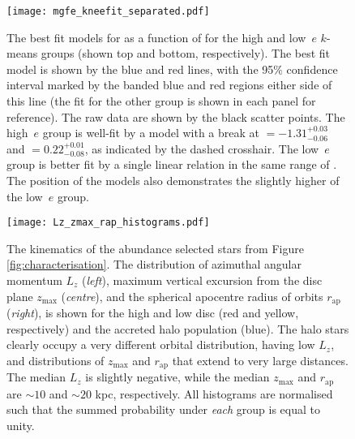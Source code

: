 \begin{figure}
\texttt{[image: mgfe\_kneefit\_separated.pdf]}
\caption{\label{fig:mgknee} The best fit models for \mgfe{} as a
function of \feh{} for the high and low~$e$ $k$-means groups (shown
top and bottom, respectively). The best fit model is shown by the
blue and red lines, with the 95$\%$ confidence interval marked by
the banded blue and red regions either side of this line (the fit
for the other group is shown in each panel for reference). The raw
data are shown by the black scatter points. The high~$e$ group is
well-fit by a model with a break at \feh{}$=-1.31^{+0.03}_{-0.06}$
and \mgfe{}$=0.22^{+0.01}_{-0.08}$, as indicated by the dashed
crosshair. The low~$e$ group is better fit by a single linear
relation in the same range of \feh{}. The position of the models
also demonstrates the slightly higher \mgfe{} of the low~$e$ group.}
\end{figure}


\begin{figure*}
\texttt{[image: Lz\_zmax\_rap\_histograms.pdf]} 
\caption{\label{fig:kinematics} The kinematics of the abundance
selected stars from Figure \ref{fig:characterisation}. The distribution
of azimuthal angular momentum $L_z$ (\emph{left}), maximum vertical
excursion from the disc plane $z_\mathrm{max}$ (\emph{centre}), and
the spherical apocentre radius of orbits $r_\mathrm{ap}$ (\emph{right}),
is shown for the high and low \afe{} disc (red and yellow, respectively)
and the accreted halo population (blue). The halo stars clearly
occupy a very different orbital distribution, having low $L_z$, and
distributions of $z_\mathrm{max}$ and $r_\mathrm{ap}$ that extend
to very large distances. The median $L_z$ is slightly negative,
while the median $z_\mathrm{max}$ and $r_\mathrm{ap}$ are $\sim10$
and $\sim 20$ kpc, respectively. All histograms are normalised such
that the summed probability under \emph{each} group is equal to
unity.}
\end{figure*}


